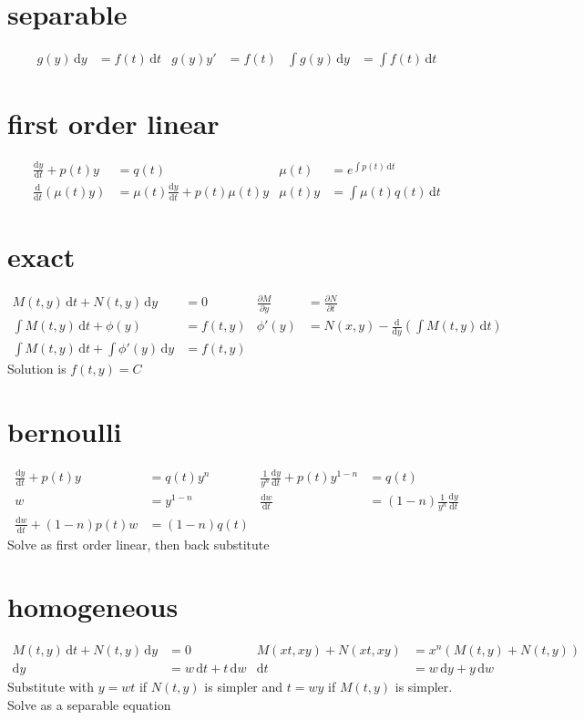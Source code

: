 \documentclass{article}
\begin{document}
\section*{separable}
\begin{align*}
g(y)\,\mathrm{d}y&=f(t)\,\mathrm{d}t & g(y)y'&=f(t) & \int{g(y)\,\mathrm{d}y}&=\int{f(t)\,\mathrm{d}t}
\end{align*}
\section*{first order linear}
\begin{align*}
\frac{\mathrm{d}y}{\mathrm{d}t}+p(t)y&=q(t) & \mu(t)&=e^{\int{p(t)\,\mathrm{d}t}}\\
\frac{\mathrm{d}}{\mathrm{d}t}\left(\mu(t)y\right)&=\mu(t)\frac{\mathrm{d}y}{\mathrm{d}t}+p(t)\mu(t)y & \mu(t)y&=\int{\mu(t)q(t)\,\mathrm{d}t}
\end{align*}
\section*{exact}
\begin{align*}
M(t,y)\,\mathrm{d}t+N(t,y)\,\mathrm{d}y&=0 & \frac{\partial M}{\partial y}&=\frac{\partial N}{\partial t}\\
\int{M(t,y)\,\mathrm{d}t}+\phi(y)&=f(t,y) & \phi'(y)&=N(x,y)-\frac{\mathrm{d}}{\mathrm{d}y}\left(\int{M(t,y)\,\mathrm{d}t}\right)\\
\int{M(t,y)\,\mathrm{d}t}+\int{\phi'(y)\,\mathrm{d}y}&=f(t,y)
\end{align*}
Solution is $f(t,y)=C$
\section*{bernoulli}
\begin{align*}
\frac{\mathrm{d}y}{\mathrm{d}t}+p(t)y&=q(t)y^n & \frac{1}{y^n}\frac{\mathrm{d}y}{\mathrm{d}t}+p(t)y^{1-n}&=q(t)\\
w&=y^{1-n} & \frac{\mathrm{d}w}{\mathrm{d}t}&=(1-n)\frac{1}{y^{n}}\frac{\mathrm{d}y}{\mathrm{d}t}\\
\frac{\mathrm{d}w}{\mathrm{d}t}+(1-n)p(t)w&=(1-n)q(t)
\end{align*}
Solve as first order linear, then back substitute
\section*{homogeneous}
\begin{align*}
M(t,y)\,\mathrm{d}t+N(t,y)\,\mathrm{d}y&=0 & M(xt,xy)+N(xt,xy)&=x^n\left(M(t,y)+N(t,y)\right)\\
\mathrm{d}y&=w\,\mathrm{d}t+t\,\mathrm{d}w &\mathrm{d}t&=w\,\mathrm{d}y+y\,\mathrm{d}w
\end{align*}
Substitute with $y=wt$ if $N(t,y)$ is simpler and $t=wy$ if $M(t,y)$ is simpler. Solve as a separable equation
\end{document}
